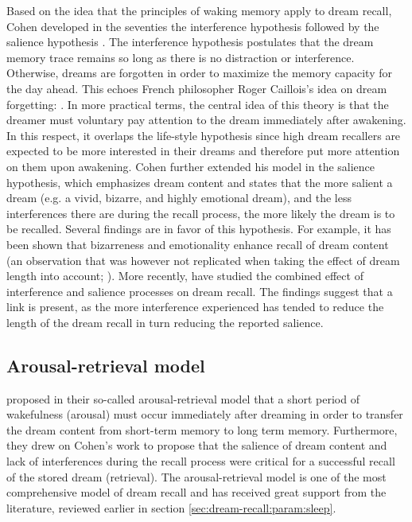 Based on the idea that the principles of waking memory apply to dream recall, Cohen developed in the seventies the interference hypothesis \citep{cohen_dream_1973} followed by the salience hypothesis \citep{cohen_test_1974}. The interference hypothesis postulates that the dream memory trace remains so long as there is no distraction or interference. Otherwise, dreams are forgotten in order to maximize the memory capacity for the day ahead. This echoes French philosopher Roger Caillois’s idea on dream forgetting:  \citep{caillois_incertitude_1956}. In more practical terms, the central idea of this theory is that the dreamer must voluntary pay attention to the dream immediately after awakening. In this respect, it overlaps the life-style hypothesis since high dream recallers are expected to be more interested in their dreams and therefore put more attention on them upon awakening.
Cohen further extended his model in the salience hypothesis, which emphasizes dream content and states that the more salient a dream (e.g. a vivid, bizarre, and highly emotional dream), and the less interferences there are during the recall process, the more likely the dream is to be recalled. Several findings are in favor of this hypothesis. For example, it has been shown that bizarreness \citep{cipolli_bizarreness_1993} and emotionality \citep{schredl_emotions_1998} enhance recall of dream content (an observation that was however not replicated when taking the effect of dream length into account; \citealp{schredl_relationship_2000}). More recently, \citet{parke_re-examination_2009} have studied the combined effect of interference and salience processes on dream recall. The findings suggest that a link is present, as the more interference experienced has tended to reduce the length of the dream recall in turn reducing the reported salience.

\subsection{Arousal-retrieval model}
\label{sec:dream-recall:theories:arousal}

\citet{koulack_dream_1976} proposed in their so-called arousal-retrieval model that a short period of wakefulness (arousal) must occur immediately after dreaming in order to transfer the dream content from short-term memory to long term memory. Furthermore, they drew on Cohen’s work to propose that the salience of dream content and lack of interferences during the recall process were critical for a successful recall of the stored dream (retrieval). The arousal-retrieval model is one of the most comprehensive model of dream recall and has received great support from the literature, reviewed earlier in section \ref{sec:dream-recall:param:sleep}.

